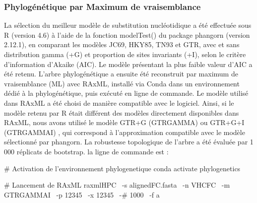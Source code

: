 \documentclass[a4paper,12pt]{article}
\begin{document}
\subsubsection {Phylogénétique par Maximum de vraisemblance}
La sélection du meilleur modèle de substitution nucléotidique a été effectuée sous R (version 4.6) à l’aide de la fonction modelTest() du package phangorn (version 2.12.1), en comparant les modèles JC69, HKY85, TN93 et GTR, avec et sans distribution gamma (+G) et proportion de sites invariants (+I), selon le critère d’information d’Akaike (AIC). Le modèle présentant la plus faible valeur d’AIC a été retenu.
L’arbre phylogénétique a ensuite été reconstruit par maximum de vraisemblance (ML) avec RAxML, installé via Conda dans un environnement dédié à la phylogénétique, puis exécuté en ligne de commande. Le modèle utilisé dans RAxML a été choisi de manière compatible avec le logiciel. Ainsi, si le modèle retenu par R était différent des modèles directement disponibles dans RAxML, nous avons utilisé le modèle GTR+G (GTRGAMMA) ou GTR+G+I (GTRGAMMAI) \cite{stamatakisRAxMLVersion82014}, qui correspond à l’approximation compatible avec le modèle sélectionné par phangorn. La robustesse topologique de l’arbre a été évaluée par 1 000 réplicats de bootstrap. la ligne de commande est : 

\begin{terminal}
# Activation de l'environnement phylogenetique
conda activate phylogenetics

# Lancement de RAxML
raxmlHPC \
-s alignedFC.fasta \
-n VHCFC \
-m GTRGAMMAI \
-p 12345 \
-x 12345 \
-# 1000 \
-f a
\end{terminal}
\end{document}
